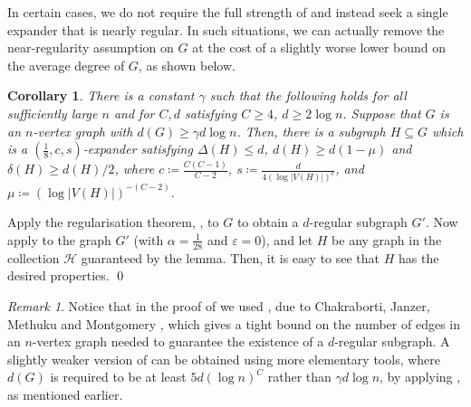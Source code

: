 \documentclass[10pt]{article}
\theoremstyle{plain}
\numberwithin{theorem}{section}
\newtheorem{corollary}[theorem]{Corollary}
\theoremstyle{definition}
\theoremstyle{remark}
\newtheorem*{rem}{Remark}
\renewenvironment{proof}[1][]{\begin{trivlist}
\item[\hspace{\labelsep}{\bf\noindent Proof#1.\/}] }{\qed\end{trivlist}}
\newcommand{\cH}{\mathcal{H}}
\newcommand{\eps}{\varepsilon}
\theoremstyle{plain}
\begin{document}
In certain cases, we do not require the full strength of  and instead seek a single expander that is nearly regular. In such situations, we can actually remove the near-regularity assumption on $G$ at the cost of a slightly worse lower bound on the average degree of $G$, as shown below.

\begin{corollary}
	\label{cor:findexpander}
	There is a constant $\gamma$ such that the following holds for all sufficiently large $n$ and for $C, d$ satisfying $C \ge 4$, $d \ge 2 \log n$.
	Suppose that $G$ is an $n$-vertex graph with $d(G) \ge \gamma d \log n$. Then, there is a subgraph $H \subseteq G$ which is a $(\frac{1}{8}, c, s)$-expander satisfying $\Delta(H) \le d$, $d(H) \ge d(1 - \mu)$ and $\delta(H) \ge d(H)/2$, where $c \coloneqq \frac{C(C-1)}{C-2}$, $s \coloneqq \frac{d}{4 (\log |V(H)|)^c}$, and $\mu \coloneqq (\log |V(H)|)^{-(C-2)}$. 
\end{corollary}

\begin{proof}[ of \Cref{cor:findexpander} using \Cref{cor:expandercoverstrong}]
	Apply the regularisation theorem, , to $G$ to obtain a $d$-regular subgraph $G'$. Now apply  to the graph $G'$ (with $\alpha = \frac{1}{28}$ and $\eps = 0$), and let $H$ be any graph in the collection $\cH$ guaranteed by the lemma. Then, it is easy to see that $H$ has the desired properties.
\end{proof}

\begin{rem}
	Notice that in the proof of  we used , due to Chakraborti, Janzer, Methuku and Montgomery \cite{CJMMregular}, which gives a tight bound on the number of edges in an $n$-vertex graph needed to guarantee the existence of a $d$-regular subgraph. A slightly weaker version of  can be obtained using more elementary tools, where $d(G)$ is required to be at least $5d(\log n)^{C}$ rather than $\gamma d\log n$, by applying \cite[Lemma~2.2]{bucic2020nearly}, as mentioned earlier.
\end{rem}
\end{document}
